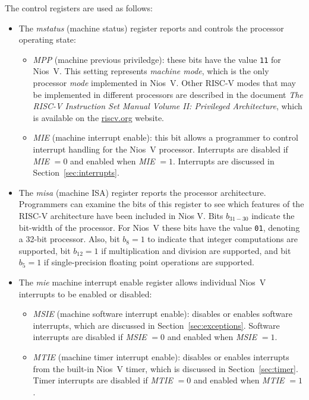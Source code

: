 \documentclass[11pt, twoside, pdftex]{article}
\begin{document}
The control registers are used as follows:
\vspace{-\baselineskip}
\begin{itemize}
\item The {\it mstatus} (machine status) register reports and controls the
processor operating state:
\begin{itemize}
\item {\it MPP} (machine previous priviledge): these bits have 
the value \texttt{11} for Nios~V. This setting represents {\it machine mode}, which is
the only processor {\it mode} implemented in Nios~V. Other RISC-V modes that may be
implemented in different processors are described in the document {\it The RISC-V Instruction
Set Manual Volume II: Privileged Architecture}, which is available on the
{\small \href{https://www.riscv.org} {riscv.org}} website. 
\item {\it MIE} (machine interrupt enable): this bit allows a programmer to control
interrupt handling for the Nios~V processor. Interrupts are disabled if 
{\it MIE} $= 0$ and enabled when {\it MIE} $= 1$.  Interrupts are discussed in 
Section~\ref{sec:interrupts}.
\end{itemize}
\item The {\it misa} (machine ISA) register reports the processor architecture.
Programmers can examine the bits of this register to see which features of the RISC-V
architecture have been included in Nios V. Bits $b_{31-30}$ indicate the bit-width of 
the processor. For Nios~V these bits have the value
\texttt{01}, denoting a 32-bit processor. Also, bit $b_8 = 1$ to indicate that integer 
computations are supported, bit $b_{12} = 1$ if multiplication 
and division are supported, and bit $b_{5} = 1$ if single-precision floating point
operations are supported.
\item The {\it mie} {machine interrupt enable} register allows individual Nios~V
interrupts to be enabled or disabled:
\begin{itemize}
\item {\it MSIE} (machine software interrupt enable): disables or enables software
interrupts, which are discussed in Section~\ref{sec:exceptions}. Software interrupts are
disabled if {\it MSIE} $= 0$ and enabled when {\it MSIE} $= 1$.
\item {\it MTIE} (machine timer interrupt enable): disables or enables interrupts from the
built-in Nios~V timer, which is discussed in Section~\ref{sec:timer}. 
Timer interrupts are disabled if {\it MTIE} $= 0$ and enabled when {\it MTIE} $= 1$.


\end{itemize}
\end{itemize}
\end{document}
